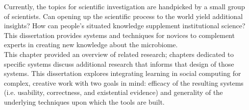 Currently, the topics for scientific investigation are handpicked
by a small group of scientists. Can opening up the
scientific process to the world yield additional insights?
How can people’s situated knowledge supplement institutional
science? This dissertation provides systems and techniques for novices to complement experts in creating new knowledge about the microbiome. \\


This chapter provided an overview of related research; chapters dedicated to specific systems discuss additional research that informs that design of those systems. This dissertation explores integrating learning in social computing for complex, creative work with two goals in mind: efficacy of the resulting systems (i.e. usability, correctness, and existential evidence) and generality of the underlying techniques upon which the tools are built.